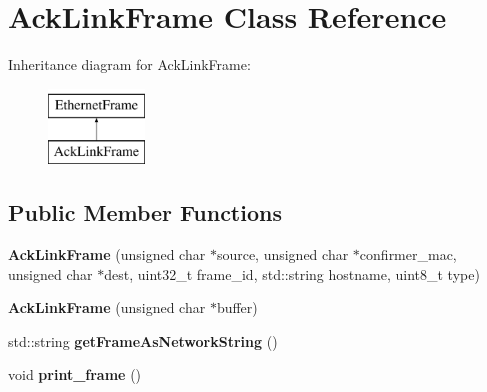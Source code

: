\hypertarget{classAckLinkFrame}{\section{Ack\-Link\-Frame Class Reference}
\label{classAckLinkFrame}
}
Inheritance diagram for Ack\-Link\-Frame\-:\begin{figure}[H]
\begin{center}
\leavevmode
\includegraphics[height=2.000000cm]{classAckLinkFrame}
\end{center}
\end{figure}
\subsection*{Public Member Functions}
\begin{DoxyCompactItemize}
\item 
\hypertarget{classAckLinkFrame_afb4084034a4d610bb3775fafcdb566c6}{{\bfseries Ack\-Link\-Frame} (unsigned char $\ast$source, unsigned char $\ast$confirmer\-\_\-mac, unsigned char $\ast$dest, uint32\-\_\-t frame\-\_\-id, std\-::string hostname, uint8\-\_\-t type)}\label{classAckLinkFrame_afb4084034a4d610bb3775fafcdb566c6}

\item 
\hypertarget{classAckLinkFrame_a83f34f1e35f7bf1ea279055998b504b9}{{\bfseries Ack\-Link\-Frame} (unsigned char $\ast$buffer)}\label{classAckLinkFrame_a83f34f1e35f7bf1ea279055998b504b9}

\item 
\hypertarget{classAckLinkFrame_a42d1b042178c29c366eb9c3787025bd7}{std\-::string {\bfseries get\-Frame\-As\-Network\-String} ()}\label{classAckLinkFrame_a42d1b042178c29c366eb9c3787025bd7}

\item 
\hypertarget{classAckLinkFrame_aa3e501d1e93dcf5c61a3db1480d4afb2}{void {\bfseries print\-\_\-frame} ()}\label{classAckLinkFrame_aa3e501d1e93dcf5c61a3db1480d4afb2}

\end{DoxyCompactItemize}
